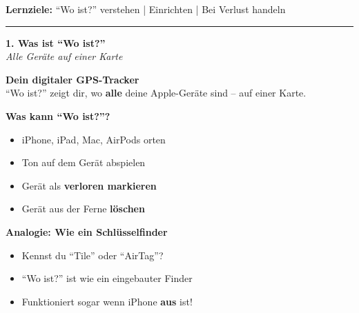 \documentclass[a4paper,landscape,8pt]{extarticle}
\begin{document}

 \hfill
{\footnotesize\textbf{Lernziele:} ``Wo ist?'' verstehen | Einrichten | Bei Verlust handeln}

\vspace{1mm}
\hrule
\vspace{1mm}

\begin{minipage}[t]{0.32\linewidth}
\begin{center}
\colorbox{findmygreen!15}{%
\begin{minipage}{0.95\linewidth}
\vspace{2mm}
\begin{center}
{\Large\bfseries\textcolor{findmygreen}{1. Was ist ``Wo ist?''}}\\[1pt]
{\footnotesize\itshape Alle Geräte auf einer Karte}
\end{center}
\vspace{2mm}
\end{minipage}%
}
\end{center}

\vspace{1mm}

\textbf{Dein digitaler GPS-Tracker}\\
``Wo ist?'' zeigt dir, wo \textbf{alle} deine Apple-Geräte sind -- auf einer Karte.

\textbf{Was kann ``Wo ist?''?}
\begin{itemize}
\item iPhone, iPad, Mac, AirPods orten
\item Ton auf dem Gerät abspielen
\item Gerät als \textbf{verloren markieren}
\item Gerät aus der Ferne \textbf{löschen}
\end{itemize}

\textbf{Analogie: Wie ein Schlüsselfinder}
\begin{itemize}
\item Kennst du ``Tile'' oder ``AirTag''?
\item ``Wo ist?'' ist wie ein eingebauter Finder
\item Funktioniert sogar wenn iPhone \textbf{aus} ist!
\end{itemize}

\vspace{2mm}

\end{minipage}%
\end{document}
